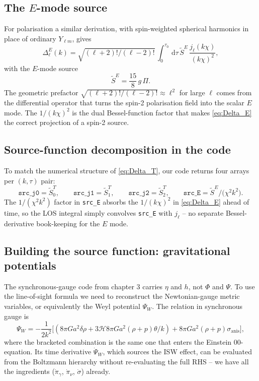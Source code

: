 \subsection{The $E$-mode source}

For polarisation a similar derivation, with spin-weighted spherical harmonics in place of ordinary $Y_{\ell m}$, gives
\begin{equation}
  \Delta^E_\ell(k) = \sqrt{(\ell + 2)!/(\ell - 2)!}\,\int_0^{\tau_0}\,\mathrm{d}\tau\,\widetilde S^E\, \frac{j_\ell(k\chi)}{(k\chi)^2},
  \label{eq:Delta_E}
\end{equation}
with the $E$-mode source
\begin{equation}
  \widetilde S^E = \frac{15}{8}\, g\, \Pi.
\end{equation}
The geometric prefactor $\sqrt{(\ell+2)!/(\ell-2)!} \approx \ell^2$ for large $\ell$ comes from the differential operator that turns the spin-2 polarisation field into the scalar $E$ mode. The $1/(k\chi)^2$ is the dual Bessel-function factor that makes \cref{eq:Delta_E} the correct projection of a spin-2 source.

\subsection{Source-function decomposition in the code}

To match the numerical structure of \cref{eq:Delta_T}, our code returns four arrays per $(k, \tau)$ pair:
\[
  \texttt{src\_j0} = \widetilde S^T_0,\qquad
  \texttt{src\_j1} = \widetilde S^T_1,\qquad
  \texttt{src\_j2} = \widetilde S^T_2,\qquad
  \texttt{src\_E} = \widetilde S^E\big/\bigl(\chi^2 k^2\bigr).
\]
The $1/(\chi^2 k^2)$ factor in \texttt{src\_E} absorbs the $1/(k\chi)^2$ in \cref{eq:Delta_E} ahead of time, so the LOS integral simply convolves \texttt{src\_E} with $j_\ell$ -- no separate Bessel-derivative book-keeping for the $E$ mode.

\subsection{Building the source function: gravitational potentials}

The synchronous-gauge code from chapter 3 carries $\eta$ and $h$, not $\Phi$ and $\Psi$. To use the line-of-sight formula we need to reconstruct the Newtonian-gauge metric variables, or equivalently the Weyl potential $\Psi_W$. The relation in synchronous gauge is
\begin{equation}
  \Psi_W = -\frac{1}{2 k^2}\bigl[(8\pi G a^2\delta\rho + 3 \mathcal{H} 8\pi G a^2 (\rho + p)\theta/k) + 8\pi G a^2 (\rho + p)\sigma_\text{anis}\bigr],
  \label{eq:Weyl}
\end{equation}
where the bracketed combination is the same one that enters the Einstein 00-equation. Its time derivative $\dot\Psi_W$, which sources the ISW effect, can be evaluated from the Boltzmann hierarchy without re-evaluating the full RHS -- we have all the ingredients ($\dot\pi_\gamma$, $\dot\pi_\nu$, $\dot\sigma$) already.

